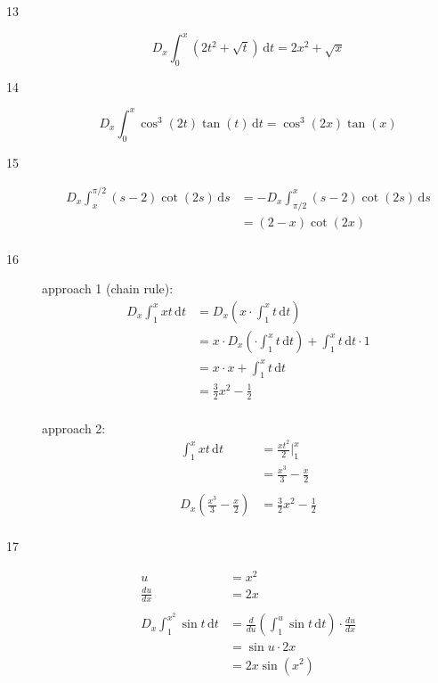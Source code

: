 \documentclass{exam}
\begin{document}
\begin{description}
\item[13]
\[
  D_x \int_0^x (2t^2 + \sqrt{t}) \, \mathrm{d}t = 2x^2 + \sqrt{x}
\]

\item[14]
\[
  D_x \int_0^x \cos^3(2t) \tan(t) \, \mathrm{d}t = \cos^3(2x) \tan(x)
\]

\item[15]
\begin{align*}
  D_x \int_x^{\pi/2} (s - 2) \cot(2s) \, \mathrm{d}s &= - D_x \int_{\pi/2}^x (s - 2) \cot(2s) \, \mathrm{d}s \\
  &= (2 - x) \cot(2x)  \\
\end{align*}

\item[16]
approach 1 (chain rule):
\begin{align*}
  D_x \int_1^x xt \, \mathrm{d}t &= D_x \left( x \cdot \int_1^x t \, \mathrm{d}t \right) \\
  &= x \cdot D_x \left( \cdot \int_1^x t \, \mathrm{d}t \right) + \int_1^x t \, \mathrm{d}t \cdot 1 \\
  &= x \cdot x + \int_1^x t \, \mathrm{d}t \\
  &= \frac{3}{2} x^2 - \frac{1}{2} \\
\end{align*}

approach 2:
\begin{align*}
  \int_1^x xt \, \mathrm{d}t &= \frac{xt^2}{2} \bigg|_1^x \\
  &= \frac{x^3}{3} - \frac{x}{2} \\
\\
  D_x \left( \frac{x^3}{3} - \frac{x}{2} \right) &= \frac{3}{2} x^2 - \frac{1}{2} \\
\end{align*}

\item[17]
\begin{align*}
  u &= x^2 \\
  \frac{du}{dx} &= 2x \\
\\
  D_x \int_1^{x^2} \sin t \, \mathrm{d}t &= \frac{d}{du} \left( \int_1^u \sin t \, \mathrm{d}t \right) \cdot \frac{du}{dx} \\
  &= \sin u \cdot 2x \\
  &= 2x \sin(x^2) \\
\end{align*}



\end{description}
\end{document}
